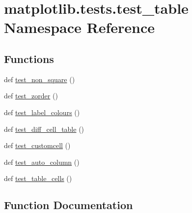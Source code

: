 \hypertarget{namespacematplotlib_1_1tests_1_1test__table}{}\section{matplotlib.\+tests.\+test\+\_\+table Namespace Reference}
\label{namespacematplotlib_1_1tests_1_1test__table}
\subsection*{Functions}
\begin{DoxyCompactItemize}
\item 
def \hyperlink{namespacematplotlib_1_1tests_1_1test__table_a8f7acd4a6c50453e81bbf9de72074b7a}{test\+\_\+non\+\_\+square} ()
\item 
def \hyperlink{namespacematplotlib_1_1tests_1_1test__table_ad11e1892fe192777d00c14f2eec4d139}{test\+\_\+zorder} ()
\item 
def \hyperlink{namespacematplotlib_1_1tests_1_1test__table_a9e8c88a4f7b3dbe014f30eb58b2e5bcf}{test\+\_\+label\+\_\+colours} ()
\item 
def \hyperlink{namespacematplotlib_1_1tests_1_1test__table_a351ae85a2c1ab0cbf628ba081f9b1c36}{test\+\_\+diff\+\_\+cell\+\_\+table} ()
\item 
def \hyperlink{namespacematplotlib_1_1tests_1_1test__table_ab4d67a3ee6597bcf3ba5c7b41036a278}{test\+\_\+customcell} ()
\item 
def \hyperlink{namespacematplotlib_1_1tests_1_1test__table_acc55367908c148ca2c461213f39965e2}{test\+\_\+auto\+\_\+column} ()
\item 
def \hyperlink{namespacematplotlib_1_1tests_1_1test__table_a67b3fe9591f4af044c25988948b96a4f}{test\+\_\+table\+\_\+cells} ()
\end{DoxyCompactItemize}


\subsection{Function Documentation}
\mbox{\label{namespacematplotlib_1_1tests_1_1test__table_acc55367908c148ca2c461213f39965e2}} 
